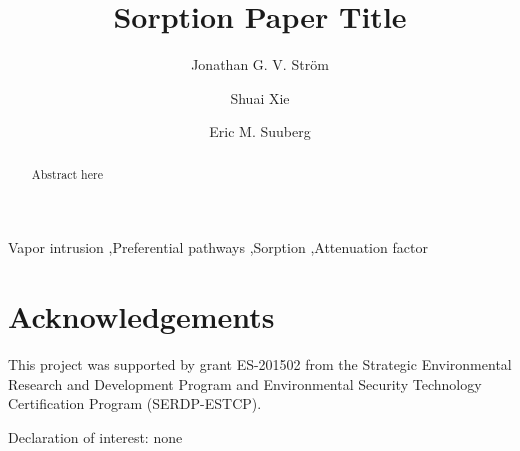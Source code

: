 \documentclass[preprint,12pt]{elsarticle}
\begin{document}
\begin{frontmatter}
\title{Sorption Paper Title}

\author[Brown]{Jonathan G. V. Ström}
\author[Brown]{Shuai Xie}
\author[Brown]{Eric M. Suuberg}


\address[Brown]{Brown University, School of Engineering, Providence, RI, USA}

\begin{abstract}
Abstract here
\end{abstract}

\begin{keyword}
  Vapor intrusion \sep Preferential pathways \sep Sorption \sep Attenuation factor
\end{keyword}

\end{frontmatter}







\section*{Acknowledgements}
This project was supported by grant ES-201502 from the Strategic Environmental Research and Development Program and Environmental Security Technology Certification Program (SERDP-ESTCP).\par

Declaration of interest: none




\end{document}
